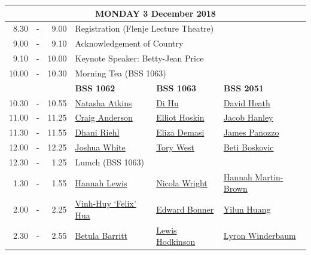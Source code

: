 \documentclass[twoside,14pt,a4paper,notitlepage]{memoir}
\begin{document}
\renewcommand{\arraystretch}{1.4}
\begin{center}
\begin{tabular}{rcr|p{3.6cm}|p{3.6cm}|p{3.6cm}}
\multicolumn{6}{c}{{\large MONDAY 3 December 2018}} \\ \hline
8.30 & - & 9.00 & \multicolumn{3}{l}{Registration (Flenje Lecture Theatre)} \\ \hline
9.00 & - & 9.10 & \multicolumn{3}{l}{Acknowledgement of Country} \\ \hline
9.10 & - & 10.00 & \multicolumn{3}{l}{Keynote Speaker: Betty-Jean Price} \\ \hline
10.00 & - & 10.30 & \multicolumn{3}{l}{Morning Tea (BSS 1063)} \\ \hline
 & & & \textbf{BSS 1062} & \textbf{BSS 1063} & \textbf{BSS 2051} \\ \hline
 10.30 & - & 10.55 & 
 \hyperref[aut:atkins]{Natasha Atkins} & 
 \hyperref[aut:hu]{Di Hu} &  
 \hyperref[aut:heath]{David Heath} \\ \hline
11.00 & - & 11.25 &
 \hyperref[aut:anderson]{Craig Anderson} &
 \hyperref[aut:hoskin]{Elliot Hoskin} &
 \hyperref[aut:hanley]{Jacob Hanley} \\ \hline
11.30 & - & 11.55 &
 \hyperref[aut:riehl]{Dhani Riehl} &
 \hyperref[aut:demasi]{Eliza Demasi} &
 \hyperref[aut:panozzo]{James Panozzo} \\ \hline
12.00 & - & 12.25 &
 \hyperref[aut:white]{Joshua White} &
 \hyperref[aut:west]{Tory West} &
 \hyperref[aut:boskovic]{Beti Boskovic} \\ \hline
12.30 & - & 1.25 & \multicolumn{3}{l}{Lumch (BSS 1063)} \\ \hline
1.30 & - & 1.55 &
 \hyperref[aut:lewis]{Hannah Lewis} &
 \hyperref[aut:wright]{Nicola Wright} &
 \hyperref[aut:brown]{Hannah Martin-Brown} \\ \hline
2.00 & - & 2.25 &
 \hyperref[aut:hua]{Vinh-Huy `Felix' Hua} &
 \hyperref[aut:bonner]{Edward Bonner} &
 \hyperref[aut:huang]{Yilun Huang} \\ \hline
2.30 & - & 2.55 &
 \hyperref[aut:barritt]{Betula Barritt} &
 \hyperref[aut:hodkinson]{Lewis Hodkinson} &
 \hyperref[aut:winderbaum]{Lyron Winderbaum} \\ \hline
\end{tabular}
\end{center}
\vfill
\end{document}
